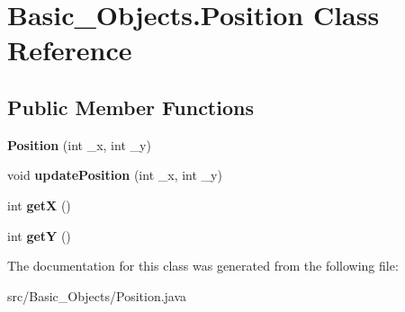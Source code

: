 \hypertarget{class_basic___objects_1_1_position}{\section{Basic\-\_\-\-Objects.\-Position Class Reference}
\label{class_basic___objects_1_1_position}
}
\subsection*{Public Member Functions}
\begin{DoxyCompactItemize}
\item 
\hypertarget{class_basic___objects_1_1_position_aebfc2323eee12f74ec390a24635117d6}{{\bfseries Position} (int \-\_\-x, int \-\_\-y)}\label{class_basic___objects_1_1_position_aebfc2323eee12f74ec390a24635117d6}

\item 
\hypertarget{class_basic___objects_1_1_position_abeb57b2c9f06ea343139f1d23b5d18f4}{void {\bfseries update\-Position} (int \-\_\-x, int \-\_\-y)}\label{class_basic___objects_1_1_position_abeb57b2c9f06ea343139f1d23b5d18f4}

\item 
\hypertarget{class_basic___objects_1_1_position_a6fa4b5005c59bda78470e793a7a13142}{int {\bfseries get\-X} ()}\label{class_basic___objects_1_1_position_a6fa4b5005c59bda78470e793a7a13142}

\item 
\hypertarget{class_basic___objects_1_1_position_a827d50dd8c09eba8eb2aa182bfadf5c2}{int {\bfseries get\-Y} ()}\label{class_basic___objects_1_1_position_a827d50dd8c09eba8eb2aa182bfadf5c2}

\end{DoxyCompactItemize}


The documentation for this class was generated from the following file\-:\begin{DoxyCompactItemize}
\item 
src/\-Basic\-\_\-\-Objects/Position.\-java\end{DoxyCompactItemize}

